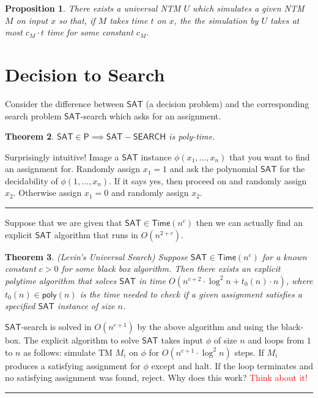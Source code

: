 \documentclass[twoside]{article}
\newcounter{lecnum}
\newtheorem{theorem}{Theorem}[lecnum]
\newtheorem{proposition}[theorem]{Proposition}
\newenvironment{proof}{{\bf Proof:}}{\hfill\rule{2mm}{2mm}}
\def\P{\mathsf{P}}
\def\Time{\mathsf{Time}}
\def\SAT{\mathsf{SAT}}
\begin{document}
\begin{proposition}
There exists a universal NTM $U$ which simulates a given NTM $M$ on input $x$ so that, if $M$ takes time $t$ on $x$, the the simulation by $U$ takes at most $c_M\cdot t$ time for some constant $c_M$. 
\end{proposition}

\section{Decision to Search}
Consider the difference between $\SAT$ (a decision problem) and the corresponding search problem $\SAT$-search which asks for an assignment. 

\begin{theorem}
$\SAT \in \P \implies \mathsf{SAT-SEARCH}$ is poly-time.
\end{theorem}
\begin{proof}
Surprisingly intuitive! Image a $\SAT$ instance $\phi(x_1, ..., x_n)$ that you want to find an assignment for. Randomly assign $x_1 = 1$ and ask the polynomial $\SAT$ for the decidability of $\phi(1, ..., x_n)$. If it says yes, then proceed on and randomly assign $x_2$. Otherwise assign $x_1 = 0$ and randomly assign $x_2$.
\end{proof}

Suppose that we are given that $\SAT \in \Time (n^c)$ then we can actually find an explicit $\SAT$ algorithm that runs in $O(n^{2+c})$.

\begin{theorem}
(Levin's Universal Search) Suppose $\SAT \in \Time(n^c)$ for a known constant $c > 0$ for some black box algorithm. Then there exists an explicit polytime algorithm that solves $\SAT$ in time $O(n^{c+2}\cdot \log^2 n + t_0(n)\cdot n)$, where $t_0(n) \in \mathsf{poly}(n)$ is the time needed to check if a given assignment satisfies a specified $\SAT$ instance of size $n$.   
\end{theorem}
\begin{proof}
$\SAT$-search is solved in $O(n^{c+1})$ by the above algorithm and using the black-box. The explicit algorithm to solve $\SAT$ takes input $\phi$ of size $n$ and loops from $1$ to $n$ as follows: simulate TM $M_i$ on $\phi$ for $O(n^{c+1}\cdot \log^2 n)$ steps. If $M_i$ produces a satisfying assignment for $\phi$ except and halt. If the loop terminates and no satisfying assignment was found, reject. Why does this work? \textcolor{red}{Think about it!}
\end{proof}
\end{document}
